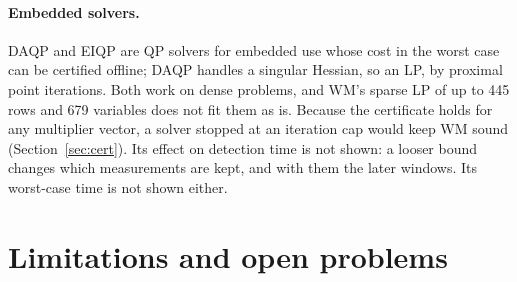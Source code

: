 \documentclass[11pt,a4paper]{article}
\begin{document}
\paragraph{Embedded solvers.} DAQP \citep{arnstrom2022} and EIQP \citep{wu2025} are QP solvers for embedded use whose
cost in the worst case can be certified offline; DAQP handles a singular Hessian, so an LP, by proximal point
iterations. Both work on dense problems, and WM's sparse LP of up to 445 rows and 679 variables does not fit them as
is. Because the certificate holds for any multiplier vector, a solver stopped at an iteration cap would keep WM sound
(Section~\ref{sec:cert}). Its effect on detection time is not shown: a looser bound changes which measurements are
kept, and with them the later windows. Its worst-case time is not shown either.

\section{Limitations and open problems}
\end{document}
